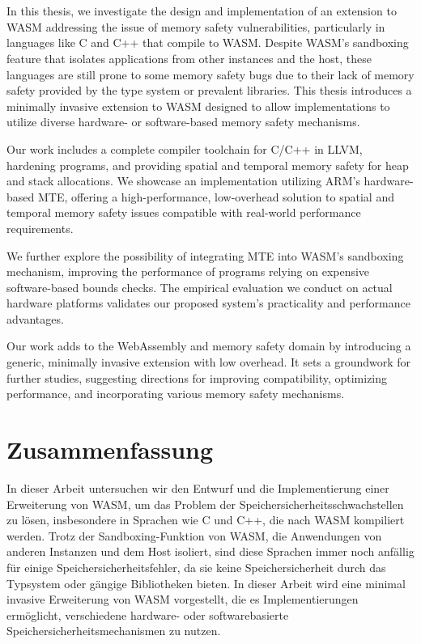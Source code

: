 \chapter{\abstractname}
\label{ch:abstract}

In this thesis, we investigate the design and implementation of an extension to \acf*{WASM} addressing the issue of memory safety vulnerabilities, particularly in languages like C and C++ that compile to \acs*{WASM}.
Despite \acs*{WASM}'s sandboxing feature that isolates applications from other instances and the host, these languages are still prone to some memory safety bugs due to their lack of memory safety provided by the type system or prevalent libraries.
This thesis introduces a minimally invasive extension to \acs*{WASM} designed to allow implementations to utilize diverse hardware- or software-based memory safety mechanisms.

Our work includes a complete compiler toolchain for C/C++ in LLVM, hardening programs, and providing spatial and temporal memory safety for heap and stack allocations.
We showcase an implementation utilizing ARM's hardware-based \acf*{MTE}, offering a high-performance, low-overhead solution to spatial and temporal memory safety issues compatible with real-world performance requirements.

We further explore the possibility of integrating \acs*{MTE} into \acs*{WASM}'s sandboxing mechanism, improving the performance of programs relying on expensive software-based bounds checks.
The empirical evaluation we conduct on actual hardware platforms validates our proposed system's practicality and performance advantages.

Our work adds to the WebAssembly and memory safety domain by introducing a generic, minimally invasive extension with low overhead.
It sets a groundwork for further studies, suggesting directions for improving compatibility, optimizing performance, and incorporating various memory safety mechanisms.

\chapter{Zusammenfassung}
\label{ch:zusammenfassung}

In dieser Arbeit untersuchen wir den Entwurf und die Implementierung einer Erweiterung von \acf*{WASM}, um das Problem der Speichersicherheitsschwachstellen zu lösen, insbesondere in Sprachen wie C und C++, die nach \acs*{WASM} kompiliert werden.
Trotz der Sandboxing-Funktion von \acs*{WASM}, die Anwendungen von anderen Instanzen und dem Host isoliert, sind diese Sprachen immer noch anfällig für einige Speichersicherheitsfehler, da sie keine Speichersicherheit durch das Typsystem oder gängige Bibliotheken bieten.
In dieser Arbeit wird eine minimal invasive Erweiterung von \acs*{WASM} vorgestellt, die es Implementierungen ermöglicht, verschiedene hardware- oder softwarebasierte Speichersicherheitsmechanismen zu nutzen.

